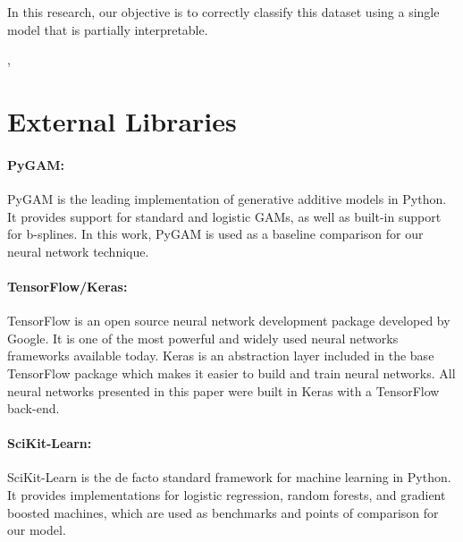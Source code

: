 In this research, our objective is to correctly classify this dataset using a single model that is partially interpretable. 

 \citep{Baldi2012AutoencodersArchitectures}, 


\section{External Libraries}

\paragraph{PyGAM:} \citep{Serven2018PyGAM:Python} PyGAM is the leading implementation of generative additive models in Python. It provides support for standard and logistic GAMs, as well as built-in support for b-splines. In this work, PyGAM  is used as a baseline comparison for our neural network technique.

\paragraph{TensorFlow/Keras:} \citep{Chollet2019Keras} \citep{Allaire2019RTensorFlow} TensorFlow is an open source neural network development package developed by Google. It is one of the most powerful and widely used neural networks frameworks available today. Keras is an abstraction layer included in the base TensorFlow package which makes it easier to build and train neural networks. All neural networks presented in this paper were built in Keras with a TensorFlow back-end.

\paragraph{SciKit-Learn:} \citep{Pedregosa2011Scikit-learn:Python} SciKit-Learn is the de facto standard framework for machine learning in Python. It provides implementations for logistic regression, random forests, and gradient boosted machines, which are used as benchmarks and points of comparison for our model. 